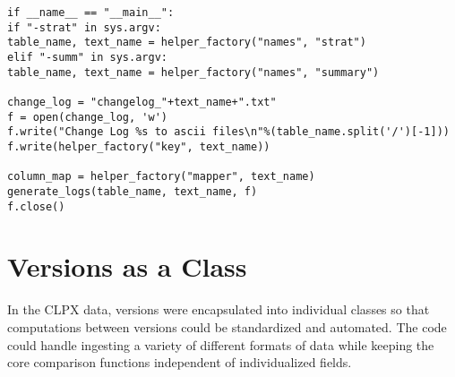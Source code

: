 \begin{verbatim}
if __name__ == "__main__":
if "-strat" in sys.argv:
table_name, text_name = helper_factory("names", "strat")
elif "-summ" in sys.argv:
table_name, text_name = helper_factory("names", "summary")

change_log = "changelog_"+text_name+".txt"
f = open(change_log, 'w')
f.write("Change Log %s to ascii files\n"%(table_name.split('/')[-1]))
f.write(helper_factory("key", text_name))

column_map = helper_factory("mapper", text_name)
generate_logs(table_name, text_name, f)
f.close()
\end{verbatim}

\section{Versions as a Class}

In the CLPX data, versions were encapsulated into individual classes so that computations between versions could be standardized and automated.
The code could handle ingesting a variety of different formats of data while keeping the core comparison functions independent of individualized fields.

